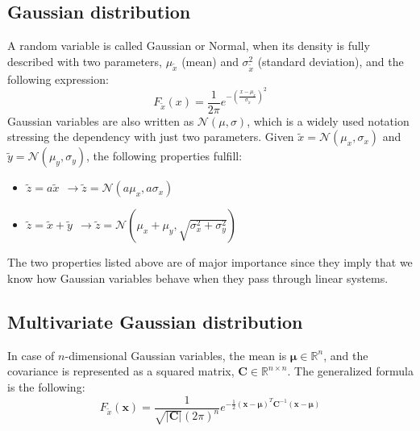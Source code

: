 \subsection{Gaussian distribution}
A random variable is called Gaussian or Normal, when its density is fully described with two parameters, $\mu_{\tilde{x}}$ (mean) and $\sigma^2_{\tilde{x}}$ (standard deviation), and the following expression:
\begin{equation}
 F_{\tilde{x}}(x) = \frac{1}{2\pi}e^{-(\frac{x-\mu_{\tilde{x}}}{\sigma_{\tilde{x}}})^2}
\end{equation}
Gaussian variables are also written as $\mathcal{N}(\mu,\sigma)$, which is a widely used notation stressing the dependency with just two parameters. Given $\tilde{x}=\mathcal{N}(\mu_x,\sigma_x)$ and $\tilde{y}=\mathcal{N}(\mu_y,\sigma_y)$, the following properties fulfill:
\begin{itemize}
 \item $\tilde{z}=a\tilde{x} \ \ \rightarrow \tilde{z}=\mathcal{N}(a\mu_x,a\sigma_x)$
 \item $\tilde{z}=\tilde{x}+\tilde{y} \ \ \rightarrow \tilde{z}=\mathcal{N}(\mu_x+\mu_y,\sqrt{\sigma^2_x+\sigma^2_y})$
\end{itemize}
The two properties listed above are of major importance since they imply that we know how Gaussian variables behave when they pass through linear systems. 


\subsection{Multivariate Gaussian distribution}
In case of $n$-dimensional Gaussian variables, the mean is $\boldsymbol{\mu} \in \mathbb{R}^n$, and the covariance is represented as a squared matrix, $\mathbf{C}\in\mathbb{R}^{n\times n}$. The generalized formula is the following: 
\begin{equation}
 F_{\tilde{x}}(\mathbf{x}) = \frac{1}{\sqrt{\vert \mathbf{C}\vert}(2\pi)^n}
			    e^{-\frac{1}{2}(\mathbf{x}-\boldsymbol\mu)^T\mathbf{C}^{-1}(\mathbf{x}-\boldsymbol\mu)}
\end{equation}

